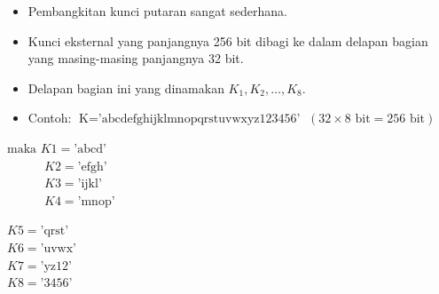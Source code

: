 \documentclass{article}
\begin{document}

\begin{itemize}
    \item Pembangkitan kunci putaran sangat sederhana.
    \item Kunci eksternal yang panjangnya 256 bit dibagi ke dalam delapan bagian yang masing-masing panjangnya 32 bit.
    \item Delapan bagian ini yang dinamakan $K_1, K_2, \dots, K_8$.
    \item Contoh: $\text{K} = \text{'abcdefghijklmnopqrstuvwxyz123456'}$ \quad $(32 \times 8 \text{ bit} = 256 \text{ bit})$
\end{itemize}

\vspace{5mm}

\begin{minipage}{0.4\textwidth}
    $\text{maka } K1 = \text{'abcd'}$ \\
    $\quad\quad\quad K2 = \text{'efgh'}$ \\
    $\quad\quad\quad K3 = \text{'ijkl'}$ \\
    $\quad\quad\quad K4 = \text{'mnop'}$
\end{minipage}
\begin{minipage}{0.4\textwidth}
    $K5 = \text{'qrst'}$ \\
    $K6 = \text{'uvwx'}$ \\
    $K7 = \text{'yz12'}$ \\
    $K8 = \text{'3456'}$
\end{minipage}
\end{document}
